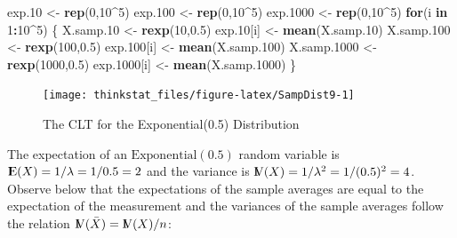 \documentclass[]{krantz}
\makeatletter
\newenvironment{Shaded}{\begin{snugshade}}{\end{snugshade}}
\newcommand{\KeywordTok}[1]{\textcolor[rgb]{0.13,0.29,0.53}{\textbf{#1}}}
\newcommand{\DecValTok}[1]{\textcolor[rgb]{0.00,0.00,0.81}{#1}}
\newcommand{\FloatTok}[1]{\textcolor[rgb]{0.00,0.00,0.81}{#1}}
\newcommand{\StringTok}[1]{\textcolor[rgb]{0.31,0.60,0.02}{#1}}
\newcommand{\ControlFlowTok}[1]{\textcolor[rgb]{0.13,0.29,0.53}{\textbf{#1}}}
\newcommand{\OperatorTok}[1]{\textcolor[rgb]{0.81,0.36,0.00}{\textbf{#1}}}
\newcommand{\NormalTok}[1]{#1}
\newcommand{\Expec}{{\rm I\kern-.3em E}}
\newcommand{\Var}{{\rm I\kern-.3em V}}
\newenvironment{kframe}{%
\medskip{}
\setlength{\fboxsep}{.8em}
 \def\at@end@of@kframe{}%
 \ifinner\ifhmode%
  \def\at@end@of@kframe{\end{minipage}}%
  \begin{minipage}{\columnwidth}%
 \fi\fi%
 \def\FrameCommand##1{\hskip\@totalleftmargin \hskip-\fboxsep
 \colorbox{shadecolor}{##1}\hskip-\fboxsep
     \hskip-\linewidth \hskip-\@totalleftmargin \hskip\columnwidth}%
 \MakeFramed {\advance\hsize-\width
   \@totalleftmargin\z@ \linewidth\hsize
   \@setminipage}}%
 {\par\unskip\endMakeFramed%
 \at@end@of@kframe}
\renewenvironment{Shaded}{\begin{kframe}}{\end{kframe}}
\theoremstyle{definition}
\theoremstyle{definition}
\theoremstyle{definition}
\theoremstyle{remark}
\makeatother
\begin{document}
\begin{Shaded}
\begin{Highlighting}[]
\NormalTok{exp.}\DecValTok{10}\NormalTok{ <-}\StringTok{ }\KeywordTok{rep}\NormalTok{(}\DecValTok{0}\NormalTok{,}\DecValTok{10}\OperatorTok{^}\DecValTok{5}\NormalTok{)}
\NormalTok{exp.}\DecValTok{100}\NormalTok{ <-}\StringTok{ }\KeywordTok{rep}\NormalTok{(}\DecValTok{0}\NormalTok{,}\DecValTok{10}\OperatorTok{^}\DecValTok{5}\NormalTok{)}
\NormalTok{exp.}\DecValTok{1000}\NormalTok{ <-}\StringTok{ }\KeywordTok{rep}\NormalTok{(}\DecValTok{0}\NormalTok{,}\DecValTok{10}\OperatorTok{^}\DecValTok{5}\NormalTok{)}
\ControlFlowTok{for}\NormalTok{(i }\ControlFlowTok{in} \DecValTok{1}\OperatorTok{:}\DecValTok{10}\OperatorTok{^}\DecValTok{5}\NormalTok{) \{}
\NormalTok{  X.samp.}\DecValTok{10}\NormalTok{ <-}\StringTok{ }\KeywordTok{rexp}\NormalTok{(}\DecValTok{10}\NormalTok{,}\FloatTok{0.5}\NormalTok{)}
\NormalTok{  exp.}\DecValTok{10}\NormalTok{[i] <-}\StringTok{ }\KeywordTok{mean}\NormalTok{(X.samp.}\DecValTok{10}\NormalTok{)}
\NormalTok{  X.samp.}\DecValTok{100}\NormalTok{ <-}\StringTok{ }\KeywordTok{rexp}\NormalTok{(}\DecValTok{100}\NormalTok{,}\FloatTok{0.5}\NormalTok{)}
\NormalTok{  exp.}\DecValTok{100}\NormalTok{[i] <-}\StringTok{ }\KeywordTok{mean}\NormalTok{(X.samp.}\DecValTok{100}\NormalTok{)}
\NormalTok{  X.samp.}\DecValTok{1000}\NormalTok{ <-}\StringTok{ }\KeywordTok{rexp}\NormalTok{(}\DecValTok{1000}\NormalTok{,}\FloatTok{0.5}\NormalTok{)}
\NormalTok{  exp.}\DecValTok{1000}\NormalTok{[i] <-}\StringTok{ }\KeywordTok{mean}\NormalTok{(X.samp.}\DecValTok{1000}\NormalTok{)}
\NormalTok{\}}
\end{Highlighting}
\end{Shaded}

\begin{figure}

{\centering \texttt{[image: thinkstat\_files/figure-latex/SampDist9-1]} 

}

\caption{The CLT for the Exponential(0.5) Distribution}\label{fig:SampDist9}
\end{figure}

The expectation of an \(\mathrm{Exponential}(0.5)\) random variable is
\(\Expec(X) = 1/\lambda = 1/0.5 = 2\) and the variance is
\(\Var(X) = 1/\lambda^2 = 1/(0.5)^2 = 4\). Observe below that the
expectations of the sample averages are equal to the expectation of the
measurement and the variances of the sample averages follow the relation
\(\Var(\bar X) = \Var (X)/n\):
\end{document}
